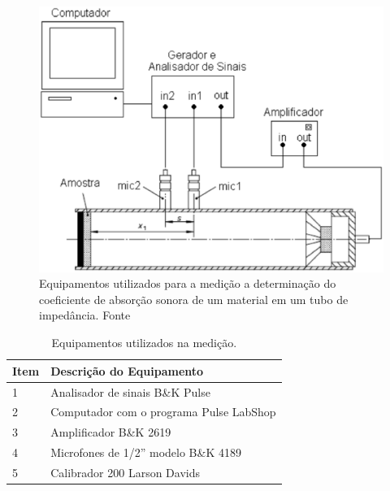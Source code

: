 \begin{figure}[h]
\centering
\includegraphics[scale=0.45]{figs/bancada.eps}
\caption{Equipamentos utilizados para a medição a determinação do coeficiente de absorção sonora de um material em um tubo de impedância. Fonte \cite{mareze2013analise}}
\label{fig.equipamento}
\end{figure}  

\begin{table}[h]
\centering
\caption{Equipamentos utilizados na medição.}
\label{tab.bancada}
\begin{tabular}{l|l}
Item               & Descrição do Equipamento                                 \\ \hline
1                  & Analisador de sinais B\&K Pulse             \\
2                  & Computador com o programa Pulse LabShop       \\
3                  & Amplificador B\&K 2619\                    \\
4                  & Microfones de 1/2'' modelo B\&K 4189         \\
5                  & Calibrador 200 Larson Davids \\
                                                        
\end{tabular}
\end{table}

